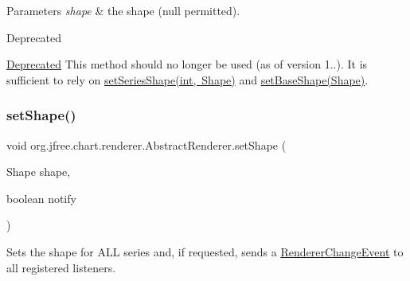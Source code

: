 \begin{DoxyParams}{Parameters}
{\em shape} & the shape ({\ttfamily null} permitted).\\
\hline
\end{DoxyParams}
\begin{DoxyRefDesc}{Deprecated}
\item[\mbox{\hyperlink{deprecated__deprecated000126}{Deprecated}}]This method should no longer be used (as of version 1..). It is sufficient to rely on \mbox{\hyperlink{classorg_1_1jfree_1_1chart_1_1renderer_1_1_abstract_renderer_a7e45f32df3421866d30c8e0c7fffe53f}{set\+Series\+Shape(int, Shape)}} and \mbox{\hyperlink{classorg_1_1jfree_1_1chart_1_1renderer_1_1_abstract_renderer_af60c105686a1d89902ed4897bdfe8e59}{set\+Base\+Shape(\+Shape)}}. \end{DoxyRefDesc}
\mbox{\label{classorg_1_1jfree_1_1chart_1_1renderer_1_1_abstract_renderer_ae5e444ff4c8373ed2f612f7c16db10b7}} 
\subsubsection{\texorpdfstring{set\+Shape()}{setShape()}\hspace{0.1cm}{\footnotesize\ttfamily [2/2]}}
{\footnotesize\ttfamily void org.\+jfree.\+chart.\+renderer.\+Abstract\+Renderer.\+set\+Shape (\begin{DoxyParamCaption}\item[{Shape}]{shape,  }\item[{boolean}]{notify }\end{DoxyParamCaption})}

Sets the shape for A\+LL series and, if requested, sends a \mbox{\hyperlink{}{Renderer\+Change\+Event}} to all registered listeners.


